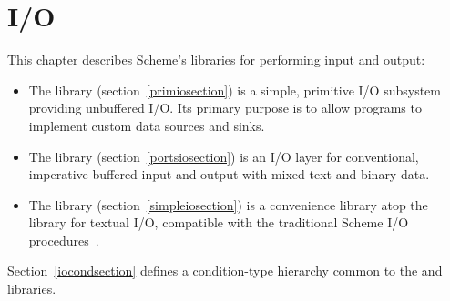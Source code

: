 \chapter{I/O}
\label{iochapter}

This chapter describes Scheme's libraries for performing input and output:

\begin{itemize}
\item The  library
  (section~\ref{primiosection}) is a simple, primitive I/O
  subsystem providing unbuffered I/O.  Its primary purpose is to allow
  programs to implement custom data sources and sinks.
\item The  library
  (section~\ref{portsiosection}) is an I/O layer for conventional,
  imperative buffered input and output with mixed text and binary
  data.
\item The  library
  (section~\ref{simpleiosection}) is a convenience library atop the
   library for textual I/O, compatible with 
  the traditional Scheme I/O procedures~\cite{R5RS}.
\end{itemize}

Section~\ref{iocondsection} defines a condition-type hierarchy common
to the  and 
libraries.






